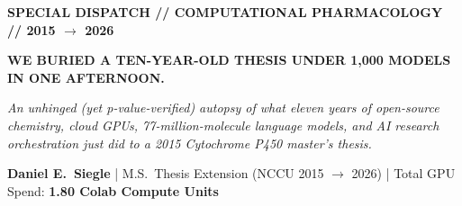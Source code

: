 \documentclass[11pt]{article}
\begin{document}
\thispagestyle{empty}

\noindent{\color{emerald}\rule{\textwidth}{3pt}}
\vspace{8pt}

{\sffamily\footnotesize\bfseries\color{crimson} SPECIAL DISPATCH // COMPUTATIONAL PHARMACOLOGY // 2015 $\longrightarrow$ 2026}

\vspace{6pt}
{\sffamily\Huge\bfseries\color{white} WE BURIED A TEN-YEAR-OLD THESIS UNDER 1,000 MODELS IN ONE AFTERNOON.}

\vspace{10pt}
{\large\color{muted} \emph{An unhinged (yet p-value-verified) autopsy of what eleven years of open-source chemistry, cloud GPUs, 77-million-molecule language models, and AI research orchestration just did to a 2015 Cytochrome P450 master's thesis.}}

\vspace{8pt}
{\sffamily\small\color{ink} \textbf{Daniel E.\ Siegle} \quad\color{muted}| \quad M.S.\ Thesis Extension (NCCU 2015 $\to$ 2026) \quad | \quad Total GPU Spend: \textbf{\color{emerald}1.80 Colab Compute Units}}
\end{document}
